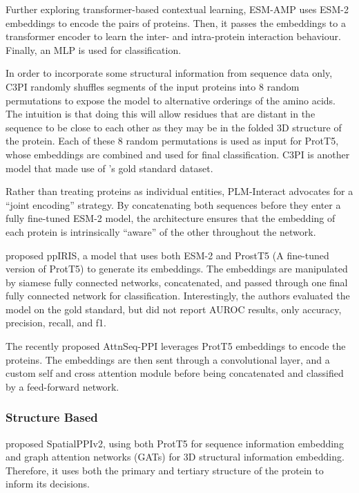 \documentclass{article}
\begin{document}
Further exploring transformer-based contextual learning, ESM-AMP \citep{sun_esm2_amp_2025} uses ESM-2 embeddings to encode the pairs of proteins. Then, it passes the embeddings to a transformer encoder to learn the inter- and intra-protein interaction behaviour. Finally, an MLP is used for classification.

In order to incorporate some structural information from sequence data only, C3PI \citep{hosseini_c3pi_2025} randomly shuffles segments of the input proteins into 8 random permutations to expose the model to alternative orderings of the amino acids. The intuition is that doing this will allow residues that are distant in the sequence to be close to each other as they may be in the folded 3D structure of the protein. Each of these 8 random permutations is used as input for ProtT5, whose embeddings are combined and used for final classification. C3PI is another model that made use of \citet{bernett_cracking_2024}'s gold standard dataset.

Rather than treating proteins as individual entities, PLM-Interact \citep{liu_plm-interact_2025} advocates for a ``joint encoding'' strategy. By concatenating both sequences before they enter a fully fine-tuned ESM-2 model, the architecture ensures that the embedding of each protein is intrinsically ``aware'' of the other throughout the network.


\citet{piochi_ppiris_2025} proposed ppIRIS, a model that uses both ESM-2 and ProstT5 (A fine-tuned version of ProtT5) to generate its embeddings. The embeddings are manipulated by siamese fully connected networks, concatenated, and passed through one final fully connected network for classification. Interestingly, the authors evaluated the model on the \citep{bernett_cracking_2024} gold standard, but did not report AUROC results, only accuracy, precision, recall, and f1.

The recently proposed AttnSeq-PPI \citep{sarkar_attnseq-ppi_2026} leverages ProtT5 embeddings to encode the proteins. The embeddings are then sent through a convolutional layer, and a custom self and cross attention module before being concatenated and classified by a feed-forward network. 

\subsubsection{Structure Based}
\citet{hu_spatialppiv2_2025} proposed SpatialPPIv2, using both ProtT5 for sequence information embedding and graph attention networks (GATs) for 3D structural information embedding. Therefore, it uses both the primary and tertiary structure of the protein to inform its decisions.
\end{document}
